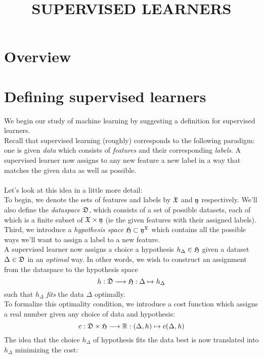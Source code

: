 


\title{SUPERVISED LEARNERS}

\maketitle	


\noindent\hrulefill
\tableofcontents
\noindent\hrulefill

\label{section-phantom}

\section{Overview}


\section{Defining supervised learners}
We begin our study of machine learning by suggesting a definition for supervised learners.\\
Recall that supervised learning (roughly) corresponds to the following paradigm: one is given \emph{data} which consists of \emph{features} and their corresponding \emph{labels}. A supervised learner now assigns to any new feature a new label in a way that matches the given data as well as possible.\\\\
Let's look at this idea in a little more detail:\\ 
To begin, we denote the sets of features and labels by $\mathfrak{X}$ and $\mathfrak{y}$ respectively. We'll also define the \emph{dataspace} $\mathfrak{D}$, which consists of a set of possible datasets, each of which is a finite subset of $\mathfrak{X}\times \mathfrak{y}$ (ie the given features with their assigned labels). Third, we introduce a \emph{hypothesis space} $\mathfrak{H}\subset \mathfrak{y}^{\mathfrak{X}}$ which contains all the possible ways we'll want to assign a label to a new feature.\\
A supervised learner now assigns a choice a hypothesis $h_\Delta \in \mathfrak{H}$ given a dataset $\Delta \in \mathfrak{D}$ in an \emph{optimal} way. In other words, we wish to construct an assignment from the dataspace to the hypothesis space
\[
h:\mathfrak{D}\longrightarrow \mathfrak{H}: \Delta\mapsto h_\Delta
\]
such that $h_\Delta$ \emph{fits} the data $\Delta$ optimally.\\ To formalize this optimality condition, we introduce a cost function which assigns a real number given any choice of data and hypothesis:
\[c: \mathfrak{D}\times \mathfrak{H}\longrightarrow \mathbb{R}: (\Delta,h)\mapsto c(\Delta,h) \]
The idea that the choice $h_\Delta$ of hypothesis fits the data best is now translated into $h_\Delta$ minimizing the cost:

